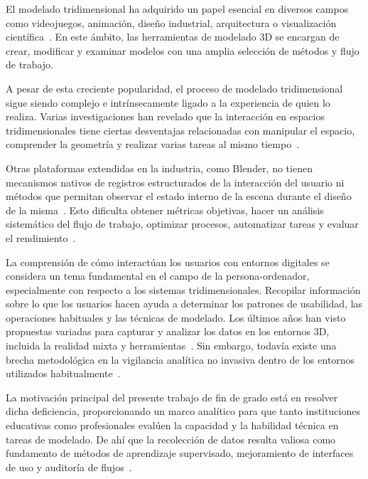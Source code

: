 
El modelado tridimensional ha adquirido un papel esencial en diversos campos como videojuegos, animación, diseño industrial, arquitectura o visualización científica~\cite{bowman2004,lavioila2017}. En este ámbito, las herramientas de modelado 3D se encargan de crear, modificar y examinar modelos con una amplia selección de métodos y flujo de trabajo.

A pesar de esta creciente popularidad, el proceso de modelado tridimensional sigue siendo complejo e intrínsecamente ligado a la experiencia de quien lo realiza. Varias investigaciones han revelado que la interacción en espacios tridimensionales tiene ciertas desventajas relacionadas con manipular el espacio, comprender la geometría y realizar varias tareas al mismo tiempo~\cite{jankowski2014,lavioila2017}.

Otras plataformas extendidas en la industria, como Blender, no tienen mecanismos nativos de registros estructurados de la interacción del usuario ni métodos que permitan observar el estado interno de la escena durante el diseño de la misma~\cite{blenderapi}. Esto dificulta obtener métricas objetivas, hacer un análisis sistemático del flujo de trabajo, optimizar procesos, automatizar tareas y evaluar el rendimiento~\cite{gao2021,gao2023}.

La comprensión de cómo interactúan los usuarios con entornos digitales se considera un tema fundamental en el campo de la persona-ordenador, especialmente con respecto a los sistemas tridimensionales. Recopilar información sobre lo que los usuarios hacen ayuda a determinar los patrones de usabilidad, las operaciones habituales y las técnicas de modelado. Los últimos años han visto propuestas variadas para capturar y analizar los datos en los entornos 3D, incluida la realidad mixta y herramientas~\cite{malik2023,3description2024}. Sin embargo, todavía existe una brecha metodológica en la vigilancia analítica no invasiva dentro de los entornos utilizados habitualmente~\cite{liu2022}.

La motivación principal del presente trabajo de fin de grado está en resolver dicha deficiencia, proporcionando un marco analítico para que tanto instituciones educativas como profesionales evalúen la capacidad y la habilidad técnica en tareas de modelado. De ahí que la recolección de datos resulta valiosa como fundamento de métodos de aprendizaje supervisado, mejoramiento de interfaces de uso y auditoría de flujos~\cite{fayyad1996kdd,vanderalst2016process}. 

